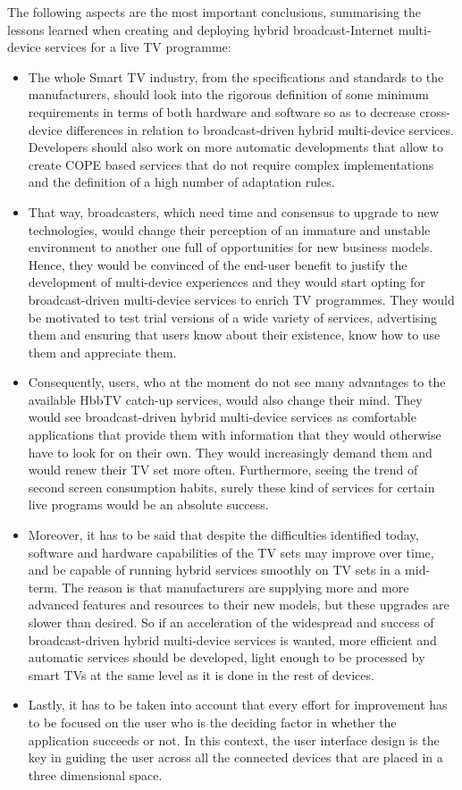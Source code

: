 The following aspects are the most important conclusions, summarising the lessons learned when creating and deploying hybrid broadcast-Internet multi-device services for a live TV programme:
\begin{itemize}
	\item The whole Smart TV industry, from the specifications and standards to the manufacturers, should look into the rigorous definition of some minimum requirements in terms of both hardware and software so as to decrease cross-device differences in relation to broadcast-driven hybrid multi-device services. Developers should also work on more automatic developments that allow to create COPE based services that do not require complex implementations and the definition of a high number of adaptation rules.  	
	\item That way, broadcasters, which need time and consensus to upgrade to new technologies, would change their perception of an immature and unstable environment to another one full of opportunities for new business models. Hence, they would be convinced of the end-user benefit to justify the development of multi-device experiences and they would start opting for broadcast-driven multi-device services to enrich TV programmes. They would be motivated to test trial versions of a wide variety of services, advertising them and ensuring that users know about their existence, know how to use them and appreciate them.
	\item Consequently, users, who at the moment do not see many advantages to the available HbbTV catch-up services, would also change their mind. They would see broadcast-driven hybrid multi-device services as comfortable applications that provide them with information that they would otherwise have to look for on their own. They would increasingly demand them and would renew their TV set more often. Furthermore, seeing the trend of second screen consumption habits, surely these kind of services for certain live programs would be an absolute success.
	\item Moreover, it has to be said that despite the difficulties identified today, software and hardware capabilities of the TV sets may improve over time, and be capable of running hybrid services smoothly on TV sets in a mid-term. The reason is that manufacturers are supplying more and more advanced features and resources to their new models, but these upgrades are slower than desired. So if an acceleration of the widespread and success of broadcast-driven hybrid multi-device services is wanted, more efficient and automatic services should be developed, light enough to be processed by smart TVs at the same level as it is done in the rest of devices. 
	\item Lastly, it has to be taken into account that every effort for improvement has to be focused on the user who is the deciding factor in whether the application succeeds or not. In this context, the user interface design is the key in guiding the user across all the connected devices that are placed in a three dimensional space.
\end{itemize}

